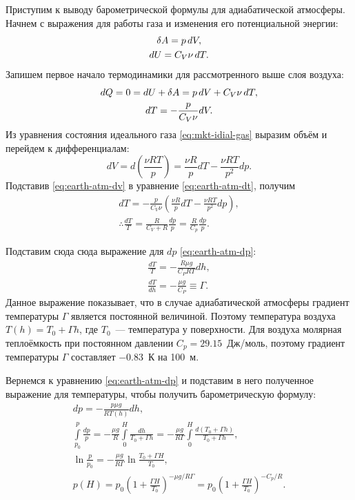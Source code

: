 Приступим к выводу барометрической формулы для адиабатической атмосферы. Начнем с выражения для работы газа и изменения его потенциальной энергии:
\begin{gather*}
	\delta A = p \,d V,\\
	dU = C_V \nu \,d T.
\end{gather*}
Запишем первое начало термодинамики для рассмотренного выше слоя воздуха:
\begin{gather}
	dQ = 0 = dU + \delta A = p \,d V + C_V \nu \,d T,\notag\\
	dT = - \frac{p}{C_V \nu} dV.
	\label{eq:earth-atm-dt}
\end{gather}
Из уравнения состояния идеального газа \eqref{eq:mkt-idial-gas} выразим объём и перейдем к дифференциалам:
\begin{equation}
	dV = d \left(\frac{\nu R T}{p} \right) = \frac{\nu R}{p} dT - \frac{\nu R T}{p^2} dp.
	\label{eq:earth-atm-dv}
\end{equation}
Подставив \eqref{eq:earth-atm-dv} в уравнение \eqref{eq:earth-atm-dt}, получим
\begin{gather*}
	dT = - \frac{p}{C_V \nu} \left( \frac{\nu R}{p} dT - \frac{\nu R T}{p^2} dp \right),\\
	\therefore \frac{dT}{T} = \frac{R}{C_V + R} \frac{dp}{p} = \frac{R}{C_p} \frac{dp}{p}.
\end{gather*}

Подставим сюда сюда выражение для $dp$ \eqref{eq:earth-atm-dp}:
\begin{gather*}
	\frac{d T}{T} = -\frac{R \mu g}{C_P R T} dh,\\
	\frac{dT}{dh} =  -\frac{\mu g}{C_P} \equiv \Gamma.
\end{gather*}
Данное выражение показывает, что в случае адиабатической атмосферы градиент температуры $\Gamma$ является постоянной величиной. Поэтому температура воздуха $T(h) = T_0 + \Gamma h$, где $T_0$~--- температура у поверхности. Для воздуха молярная теплоёмкость при постоянном давлении $C_p = 29.15$~Дж/моль, поэтому градиент температуры $\Gamma$ составляет $-0.83$~К на 100~м. 

Вернемся к уравнению \eqref{eq:earth-atm-dp} и подставим в него полученное выражение для температуры, чтобы получить барометрическую формулу:
\begin{gather*}
	dp = - \frac{p \mu g}{RT(h)} dh,\\
	\int\limits_{p_0}^p \frac{dp}{p} = - \frac{\mu g}{R} \int\limits_0^H \frac{dh}{T_0 + \Gamma h}= - \frac{\mu g}{R\Gamma} \int\limits_0^H \frac{d(T_0 + \Gamma h)}{T_0 + \Gamma h},\\
	\ln \frac{p}{p_0} = - \frac{\mu g}{R\Gamma} \ln \frac{T_0 + \Gamma H}{T_0},\\
	p(H) = p_0 \left(1 + \frac{\Gamma H}{T_0} \right)^{ - \mu g /R\Gamma} =  p_0 \left(1 + \frac{\Gamma H}{T_0} \right)^{ - C_p/R}.
\end{gather*}

